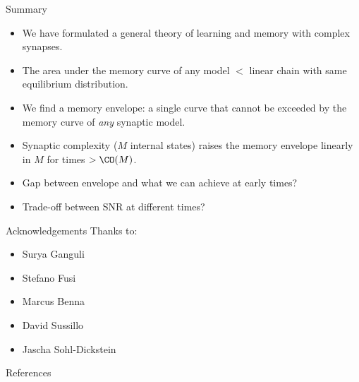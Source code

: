\documentclass{beamer}%
\begin{document}
\begin{frame}{Summary}
%
  \begin{itemize}
    \item We have formulated a general theory of learning and memory with complex synapses.
    \item The area under the memory curve of any model $<$ linear chain with same equilibrium distribution.
    \item We find a memory envelope: a single curve that cannot be exceeded by the memory curve of \emph{any} synaptic model.
    \item Synaptic complexity ($M$ internal states) raises the memory envelope linearly in $M$ for times $> \CO(M)$.
    \item Gap between envelope and what we can achieve at early times?
    \item Trade-off between SNR at different times?
  \end{itemize}

%
\end{frame}





%
%
%

\begin{frame}{Acknowledgements}
%
 Thanks to:
 \begin{itemize}
   \item Surya Ganguli
   \item Stefano Fusi
   \item Marcus Benna
   \item David Sussillo
   \item Jascha Sohl-Dickstein
 \end{itemize}
%
\end{frame}


\begin{frame}[allowframebreaks]{References}
%

 {\small
 
 
 }
%
\end{frame}
\end{document}
